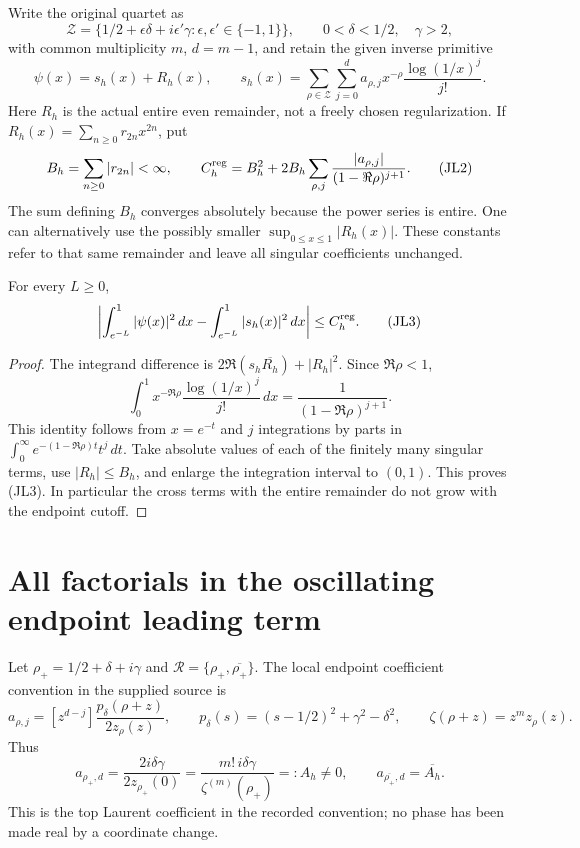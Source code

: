 Write the original quartet as
\[
\mathcal Z=\{1/2+\epsilon\delta+i\epsilon'\gamma:
                 \epsilon,\epsilon'\in\{-1,1\}\},
\qquad 0<\delta<1/2,\quad\gamma>2,
\]
with common multiplicity \(m\), \(d=m-1\), and retain the given inverse
primitive
\[
\psi(x)=s_h(x)+R_h(x),\qquad
s_h(x)=\sum_{\rho\in\mathcal Z}\sum_{j=0}^{d}
a_{\rho,j}x^{-\rho}\frac{\log(1/x)^j}{j!}.
\tag{JL1}
\]
Here \(R_h\) is the actual entire even remainder, not a freely chosen
regularization.  If
\(R_h(x)=\sum_{n\ge0}r_{2n}x^{2n}\), put
\[
B_h=\sum_{n\ge0}|r_{2n}|<\infty,\qquad
C_h^{\rm reg}=B_h^2+
2B_h\sum_{\rho,j}
\frac{|a_{\rho,j}|}{(1-\Re\rho)^{j+1}}.
\tag{JL2}
\]
The sum defining \(B_h\) converges absolutely because the power series
is entire.  One can alternatively use the possibly smaller
\(\sup_{0\le x\le1}|R_h(x)|\).  These constants refer to that same remainder
and leave all singular coefficients unchanged.

\begin{proposition}
For every \(L\ge0\),
\[
\left|\int_{e^{-L}}^1|\psi(x)|^2\,dx
      -\int_{e^{-L}}^1|s_h(x)|^2\,dx\right|
\le C_h^{\rm reg}.
\tag{JL3}
\]
\end{proposition}
\begin{proof}
The integrand difference is
\(2\Re(s_h\overline{R_h})+|R_h|^2\).  Since
\(\Re\rho<1\),
\[
\int_0^1 x^{-\Re\rho}\frac{\log(1/x)^j}{j!}\,dx
=\frac1{(1-\Re\rho)^{j+1}}.
\]
This identity follows from \(x=e^{-t}\) and \(j\) integrations by parts
in \(\int_0^\infty e^{-(1-\Re\rho)t}t^j\,dt\).
Take absolute values of each of the finitely many singular terms,
use \(|R_h|\le B_h\), and enlarge the integration interval to \((0,1)\).
This proves (JL3).  In particular the cross terms with the entire
remainder do not grow with the endpoint cutoff.
\end{proof}

\section{All factorials in the oscillating endpoint leading term}

Let
\(\rho_+=1/2+\delta+i\gamma\) and
\(\mathcal R=\{\rho_+,\overline{\rho_+}\}\).
The local endpoint coefficient convention in the supplied source is
\[
a_{\rho,j}=[z^{d-j}]
\frac{p_\delta(\rho+z)}{2z_\rho(z)},\qquad
p_\delta(s)=(s-1/2)^2+\gamma^2-\delta^2,\qquad
\zeta(\rho+z)=z^m z_\rho(z).
\tag{JL4}
\]
Thus
\[
a_{\rho_+,d}
=\frac{2i\delta\gamma}{2z_{\rho_+}(0)}
=\frac{m!\,i\delta\gamma}{\zeta^{(m)}(\rho_+)}
=:A_h\ne0,\qquad
a_{\overline{\rho_+},d}=\overline{A_h}.
\tag{JL5}
\]
This is the top Laurent coefficient in the recorded convention; no
phase has been made real by a coordinate change.

